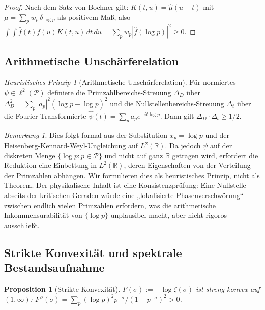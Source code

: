 \documentclass[12pt,a4paper]{article}
\newtheorem{proposition}[theorem]{Proposition}
\theoremstyle{definition}
\theoremstyle{remark}
\newtheorem{remark}[theorem]{Bemerkung}
\newtheorem{heuristic}[theorem]{Heuristisches Prinzip}
\newcommand{\PP}{\mathcal{P}}
\begin{document}
\begin{proof}
Nach dem Satz von Bochner gilt: $K(t,u) = \hat{\mu}(u-t)$ mit $\mu = \sum_p w_p\,\delta_{\log p}$ als positivem Maß, also $\int\!\!\int \bar{f}(t)f(u)K(t,u)\,dt\,du = \sum_p w_p|\hat{f}(\log p)|^2 \geq 0$.
\end{proof}

\subsection{Arithmetische Unschärferelation}

\begin{heuristic}[Arithmetische Unschärferelation]
\label{heur:uncertainty}
Für normiertes $\psi \in \ell^2(\PP)$ definiere die Primzahlbereichs-Streuung $\Delta_D$ über $\Delta_D^2 = \sum_p |a_p|^2(\log p - \overline{\log p})^2$ und die Nullstellenbereichs-Streuung $\Delta_t$ über die Fourier-Transformierte $\hat\psi(t) = \sum_p a_p e^{-it\log p}$. Dann gilt $\Delta_D \cdot \Delta_t \geq 1/2$.
\end{heuristic}

\begin{remark}
Dies folgt formal aus der Substitution $x_p = \log p$ und der Heisenberg-Kennard-Weyl-Ungleichung auf $L^2(\mathbb{R})$. Da jedoch $\psi$ auf der diskreten Menge $\{\log p : p \in \PP\}$ und nicht auf ganz $\mathbb{R}$ getragen wird, erfordert die Reduktion eine Einbettung in $L^2(\mathbb{R})$, deren Eigenschaften von der Verteilung der Primzahlen abhängen. Wir formulieren dies als heuristisches Prinzip, nicht als Theorem. Der physikalische Inhalt ist eine Konsistenzprüfung: Eine Nullstelle abseits der kritischen Geraden würde eine „lokalisierte Phasenverschwörung“ zwischen endlich vielen Primzahlen erfordern, was die arithmetische Inkommensurabilität von $\{\log p\}$ unplausibel macht, aber nicht rigoros ausschließt.
\end{remark}

\subsection{Strikte Konvexität und spektrale Bestandsaufnahme}

\begin{proposition}[Strikte Konvexität]
\label{prop:convexity}
$F(\sigma) := -\log\zeta(\sigma)$ ist streng konvex auf $(1,\infty)$: $F''(\sigma) = \sum_p (\log p)^2 p^{-\sigma}/(1-p^{-\sigma})^2 > 0$.
\end{proposition}
\end{document}
